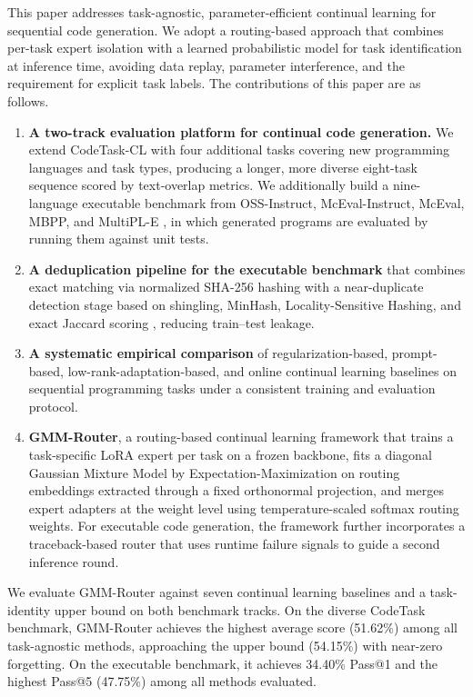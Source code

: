 This paper addresses task-agnostic, parameter-efficient continual learning for sequential code generation. We adopt a routing-based approach that combines per-task expert isolation with a learned probabilistic model for task identification at inference time, avoiding data replay, parameter interference, and the requirement for explicit task labels. The contributions of this paper are as follows.

\begin{enumerate}[leftmargin=*]
\item \textbf{A two-track evaluation platform for continual code generation.} We extend CodeTask-CL \citep{yadav2023exploring} with four additional tasks covering new programming languages and task types, producing a longer, more diverse eight-task sequence scored by text-overlap metrics. We additionally build a nine-language executable benchmark from OSS-Instruct, McEval-Instruct, McEval, MBPP, and MultiPL-E \citep{wei2023magicoder,chai2024mceval,austin2021program,cassano2023multipl}, in which generated programs are evaluated by running them against unit tests.
\item \textbf{A deduplication pipeline for the executable benchmark} that combines exact matching via normalized SHA-256 hashing with a near-duplicate detection stage based on shingling, MinHash, Locality-Sensitive Hashing, and exact Jaccard scoring \citep{jaccard1901distribution,broder1997resemblance,indyk1998approximate}, reducing train--test leakage.
\item \textbf{A systematic empirical comparison} of regularization-based, prompt-based, low-rank-adaptation-based, and online continual learning baselines on sequential programming tasks under a consistent training and evaluation protocol.
\item \textbf{GMM-Router}, a routing-based continual learning framework that trains a task-specific LoRA expert per task on a frozen backbone, fits a diagonal Gaussian Mixture Model by Expectation-Maximization on routing embeddings extracted through a fixed orthonormal projection, and merges expert adapters at the weight level using temperature-scaled softmax routing weights. For executable code generation, the framework further incorporates a traceback-based router that uses runtime failure signals to guide a second inference round.
\end{enumerate}

We evaluate GMM-Router against seven continual learning baselines and a task-identity upper bound on both benchmark tracks. On the diverse CodeTask benchmark, GMM-Router achieves the highest average score (51.62\%) among all task-agnostic methods, approaching the upper bound (54.15\%) with near-zero forgetting. On the executable benchmark, it achieves 34.40\% Pass@1 and the highest Pass@5 (47.75\%) among all methods evaluated.

